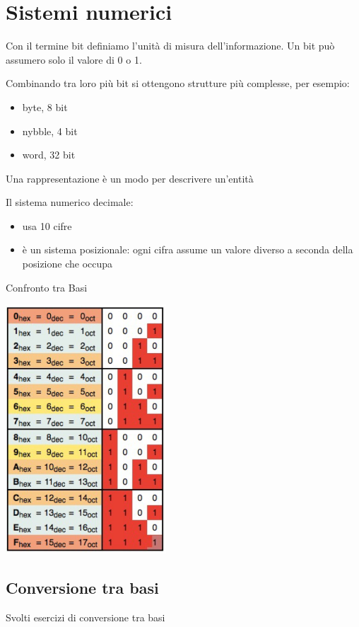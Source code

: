 \documentclass[12pt, a4paper, openany]{book}
\begin{document}

\chapter{Sistemi numerici} 

Con il termine bit definiamo l'unità di misura dell'informazione. Un bit può assumero solo il valore di 0 o 1.

Combinando tra loro più bit si ottengono strutture più complesse, per esempio:
\begin{itemize}
    \item byte, 8 bit
    \item nybble, 4 bit
    \item word, 32 bit
\end{itemize}

Una rappresentazione è un modo per descrivere un'entità

Il sistema numerico decimale:

\begin{itemize}
    \item usa 10 cifre
    \item è un sistema posizionale: ogni cifra assume un valore diverso a seconda della posizione che occupa
\end{itemize}

Confronto tra Basi
\begin{center}
    \includegraphics[width=60mm,scale=0.5]{confronto_tra_basi.png}    
\end{center}

\section{Conversione tra basi}
Svolti esercizi di conversione tra basi
\end{document}
